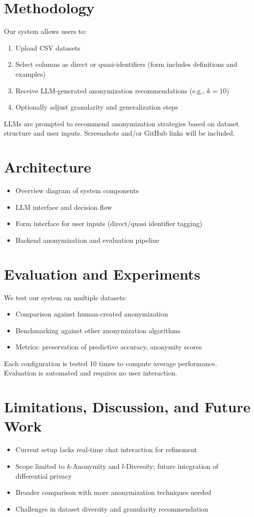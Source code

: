 \documentclass{article}
\begin{document}
\section{Methodology}
Our system allows users to:
\begin{enumerate}
    \item Upload CSV datasets
    \item Select columns as direct or quasi-identifiers (form includes definitions and examples)
    \item Receive LLM-generated anonymization recommendations (e.g., $k=10$)
    \item Optionally adjust granularity and generalization steps
\end{enumerate}
LLMs are prompted to recommend anonymization strategies based on dataset structure and user inputs. Screenshots and/or GitHub links will be included.

\section{Architecture}
\begin{itemize}
    \item Overview diagram of system components
    \item LLM interface and decision flow
    \item Form interface for user inputs (direct/quasi identifier tagging)
    \item Backend anonymization and evaluation pipeline
\end{itemize}

\section{Evaluation and Experiments}
We test our system on multiple datasets:
\begin{itemize}
    \item Comparison against human-created anonymization
    \item Benchmarking against other anonymization algorithms
    \item Metrics: preservation of predictive accuracy, anonymity scores
\end{itemize}
Each configuration is tested 10 times to compute average performance. Evaluation is automated and requires no user interaction.

\section{Limitations, Discussion, and Future Work}
\begin{itemize}
    \item Current setup lacks real-time chat interaction for refinement
    \item Scope limited to $k$-Anonymity and $l$-Diversity; future integration of differential privacy
    \item Broader comparison with more anonymization techniques needed
    \item Challenges in dataset diversity and granularity recommendation
\end{itemize}
\end{document}
